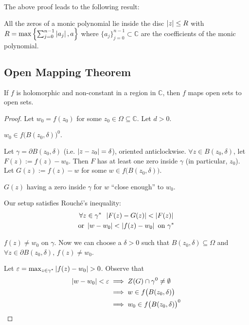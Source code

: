 \documentclass[notoc,notitlepage]{tufte-book}
\begin{document}
The above proof leads to the following result:

\begin{crly}\label{crly:rouche_fta_crly}
  All the zeros of a monic polynomial lie inside the disc $\left|z\right| \leq R$ with $R = \max\left\{ \sum_{j=0}^{n-1} \left|a_j\right| , a \right\}$ where $\{a_j\}_{j = 0}^{n - 1} \subset \mathbb{C}$ are the coefficients of the monic polynomial.
\end{crly}


\subsection{Open Mapping Theorem} %
\label{sub:open_mapping_theorem}

\begin{thm}\label{thm:open_mapping_theorem}
  If $f$ is holomorphic and non-constant in a region in $\mathbb{C}$, then $f$ maps open sets to open sets.
\end{thm}

\begin{proof}
  Let $w_0 = f(z_0)$ for some $z_0 \in \Omega \subseteq \mathbb{C}$. Let $d > 0$.

   $w_0 \in f\big(B(z_0, \delta) \big)^0$.

  Let $\gamma = \partial B(z_0, \delta)$ (i.e. $\left|z - z_0\right| = \delta$), oriented anticlockwise. $\forall z \in B(z_0, \delta)$, let $F(z) := f(z) - w_0$. Then $F$ has at least one zero inside $\gamma$ (in particular, $z_0$). Let $G(z) := f(z) - w$ for some $w \in f\big( B(z_0, \delta) \big)$.

   $G(z)$ having a zero inside $\gamma$ for $w$ ``close enough'' to $w_0$.

  Our setup satisfies Rouch\'e's inequality:
  \begin{gather*}
    \forall z \in \gamma^* \enspace \left|F(z) - G(z)\right| < \left|F(z)\right| \\
    \text{or } \left|w - w_0\right| < \left|f(z) - w_0\right| \text{ on } \gamma^*
  \end{gather*}

   $f(z) \neq w_0$ on $\gamma$. Now we can choose a $\delta > 0$ such that $B(z_0, \delta) \subseteq \Omega$ and $\forall z \in \partial B(z_0, \delta), \, f(z) \neq w_0$.

  Let $\varepsilon = \max_{z \in \gamma^*} \left|f(z) - w_0\right| > 0$. Observe that
  \begin{align*}
    \left|w - w_0\right| < \varepsilon
      &\implies Z(G) \cap \gamma^0 \neq \emptyset \\
      &\implies w \in f\big( B(z_0, \delta) \big) \\
      &\implies w_0 \in f\big( B(z_0, \delta) \big)^0
  \end{align*}
\end{proof}
\end{document}

